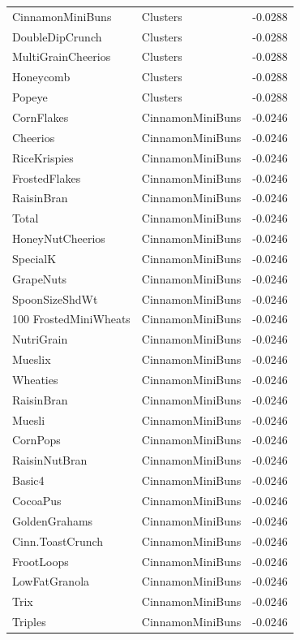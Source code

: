 \begin{longtable}{llr}
CinnamonMiniBuns & Clusters & -0.0288 \\
DoubleDipCrunch & Clusters & -0.0288 \\
MultiGrainCheerios & Clusters & -0.0288 \\
Honeycomb & Clusters & -0.0288 \\
Popeye & Clusters & -0.0288 \\
CornFlakes & CinnamonMiniBuns & -0.0246 \\
Cheerios & CinnamonMiniBuns & -0.0246 \\
RiceKrispies & CinnamonMiniBuns & -0.0246 \\
FrostedFlakes & CinnamonMiniBuns & -0.0246 \\
RaisinBran & CinnamonMiniBuns & -0.0246 \\
Total & CinnamonMiniBuns & -0.0246 \\
HoneyNutCheerios & CinnamonMiniBuns & -0.0246 \\
SpecialK & CinnamonMiniBuns & -0.0246 \\
GrapeNuts & CinnamonMiniBuns & -0.0246 \\
SpoonSizeShdWt & CinnamonMiniBuns & -0.0246 \\
100%
FrostedMiniWheats & CinnamonMiniBuns & -0.0246 \\
NutriGrain & CinnamonMiniBuns & -0.0246 \\
Mueslix & CinnamonMiniBuns & -0.0246 \\
Wheaties & CinnamonMiniBuns & -0.0246 \\
RaisinBran & CinnamonMiniBuns & -0.0246 \\
Muesli & CinnamonMiniBuns & -0.0246 \\
CornPops & CinnamonMiniBuns & -0.0246 \\
RaisinNutBran & CinnamonMiniBuns & -0.0246 \\
Basic4 & CinnamonMiniBuns & -0.0246 \\
CocoaPus & CinnamonMiniBuns & -0.0246 \\
GoldenGrahams & CinnamonMiniBuns & -0.0246 \\
Cinn.ToastCrunch & CinnamonMiniBuns & -0.0246 \\
FrootLoops & CinnamonMiniBuns & -0.0246 \\
LowFatGranola & CinnamonMiniBuns & -0.0246 \\
Trix & CinnamonMiniBuns & -0.0246 \\
Triples & CinnamonMiniBuns & -0.0246 \\

\end{longtable}
